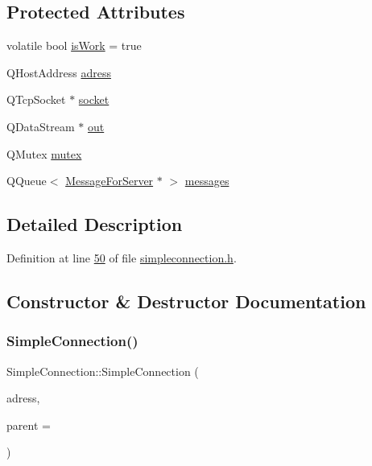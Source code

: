 \subsection*{Protected Attributes}
\begin{DoxyCompactItemize}
\item 
volatile bool \hyperlink{a00125_a45a1e7ba5a9538bd382d24d364d0bbe5}{is\+Work} = true
\item 
Q\+Host\+Address \hyperlink{a00125_afd0b4e345d57b690f1a1e12c4816e268}{adress}
\item 
Q\+Tcp\+Socket $\ast$ \hyperlink{a00125_aee87a3e761deb38bce08ebb30cd73362}{socket}
\item 
Q\+Data\+Stream $\ast$ \hyperlink{a00125_a8db5848b9d5d30739d609feb973b86d2}{out}
\item 
Q\+Mutex \hyperlink{a00125_acb6f6147828cec46cc69459f0de82cb0}{mutex}
\item 
Q\+Queue$<$ \hyperlink{a00121}{Message\+For\+Server} $\ast$ $>$ \hyperlink{a00125_aadfc449afe00e48e200ae5f94bc9f2f7}{messages}
\end{DoxyCompactItemize}


\subsection{Detailed Description}


Definition at line \hyperlink{a00008_source_l00050}{50} of file \hyperlink{a00008_source}{simpleconnection.\+h}.



\subsection{Constructor \& Destructor Documentation}
\mbox{\label{a00125_a2bcb23e4dcb42f9149d6c66b326fc475}} 
\subsubsection{\texorpdfstring{Simple\+Connection()}{SimpleConnection()}}
{\footnotesize\ttfamily Simple\+Connection\+::\+Simple\+Connection (\begin{DoxyParamCaption}\item[{Q\+Host\+Address}]{adress,  }\item[{Q\+Object $\ast$}]{parent = {} }\end{DoxyParamCaption})\hspace{0.3cm}{\ttfamily [explicit]}}



